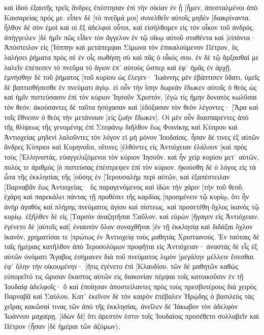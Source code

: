καὶ ἰδοὺ ἐξαυτῆς τρεῖς ἄνδρες ἐπέστησαν ἐπὶ τὴν οἰκίαν ἐν ᾗ [ἦμεν, ἀπεσταλμένοι ἀπὸ Καισαρείας πρός με. 
εἶπεν δὲ [τὸ πνεῦμά μοι] συνελθεῖν αὐτοῖς μηδὲν [διακρίναντα. ἦλθον δὲ σὺν ἐμοὶ καὶ οἱ ἓξ ἀδελφοὶ οὗτοι, καὶ εἰσήλθομεν εἰς τὸν οἶκον τοῦ ἀνδρός. 
ἀπήγγειλεν [δὲ ἡμῖν πῶς εἶδεν τὸν ἄγγελον ἐν τῷ οἴκῳ αὐτοῦ σταθέντα καὶ [εἰπόντα· Ἀπόστειλον εἰς [Ἰόππην καὶ μετάπεμψαι Σίμωνα τὸν ἐπικαλούμενον Πέτρον, 
ὃς λαλήσει ῥήματα πρὸς σὲ ἐν οἷς σωθήσῃ σὺ καὶ πᾶς ὁ οἶκός σου. 
ἐν δὲ τῷ ἄρξασθαί με λαλεῖν ἐπέπεσεν τὸ πνεῦμα τὸ ἅγιον ἐπ᾽ αὐτοὺς ὥσπερ καὶ ἐφ᾽ ἡμᾶς ἐν ἀρχῇ. 
ἐμνήσθην δὲ τοῦ ῥήματος [τοῦ κυρίου ὡς ἔλεγεν· Ἰωάννης μὲν ἐβάπτισεν ὕδατι, ὑμεῖς δὲ βαπτισθήσεσθε ἐν πνεύματι ἁγίῳ. 
εἰ οὖν τὴν ἴσην δωρεὰν ἔδωκεν αὐτοῖς ὁ θεὸς ὡς καὶ ἡμῖν πιστεύσασιν ἐπὶ τὸν κύριον Ἰησοῦν Χριστόν, [ἐγὼ τίς ἤμην δυνατὸς κωλῦσαι τὸν θεόν; 
ἀκούσαντες δὲ ταῦτα ἡσύχασαν καὶ [ἐδόξασαν τὸν θεὸν λέγοντες· [Ἄρα καὶ τοῖς ἔθνεσιν ὁ θεὸς τὴν μετάνοιαν [εἰς ζωὴν ἔδωκεν]. 
Οἱ μὲν οὖν διασπαρέντες ἀπὸ τῆς θλίψεως τῆς γενομένης ἐπὶ Στεφάνῳ διῆλθον ἕως Φοινίκης καὶ Κύπρου καὶ Ἀντιοχείας μηδενὶ λαλοῦντες τὸν λόγον εἰ μὴ μόνον Ἰουδαίοις. 
ἦσαν δέ τινες ἐξ αὐτῶν ἄνδρες Κύπριοι καὶ Κυρηναῖοι, οἵτινες [ἐλθόντες εἰς Ἀντιόχειαν ἐλάλουν [καὶ πρὸς τοὺς [Ἑλληνιστάς, εὐαγγελιζόμενοι τὸν κύριον Ἰησοῦν. 
καὶ ἦν χεὶρ κυρίου μετ᾽ αὐτῶν, πολύς τε ἀριθμὸς [ὁ πιστεύσας ἐπέστρεψεν ἐπὶ τὸν κύριον. 
ἠκούσθη δὲ ὁ λόγος εἰς τὰ ὦτα τῆς ἐκκλησίας τῆς [οὔσης ἐν [Ἰερουσαλὴμ περὶ αὐτῶν, καὶ ἐξαπέστειλαν [Βαρναβᾶν ἕως Ἀντιοχείας· 
ὃς παραγενόμενος καὶ ἰδὼν τὴν χάριν [τὴν τοῦ θεοῦ, ἐχάρη καὶ παρεκάλει πάντας τῇ προθέσει τῆς καρδίας [προσμένειν τῷ κυρίῳ, 
ὅτι ἦν ἀνὴρ ἀγαθὸς καὶ πλήρης πνεύματος ἁγίου καὶ πίστεως. καὶ προσετέθη ὄχλος ἱκανὸς τῷ κυρίῳ. 
ἐξῆλθεν δὲ εἰς [Ταρσὸν ἀναζητῆσαι Σαῦλον, 
καὶ εὑρὼν [ἤγαγεν εἰς Ἀντιόχειαν. ἐγένετο δὲ [αὐτοῖς καὶ] ἐνιαυτὸν ὅλον συναχθῆναι [ἐν τῇ ἐκκλησίᾳ καὶ διδάξαι ὄχλον ἱκανόν, χρηματίσαι τε [πρώτως ἐν Ἀντιοχείᾳ τοὺς μαθητὰς Χριστιανούς. 
Ἐν ταύταις δὲ ταῖς ἡμέραις κατῆλθον ἀπὸ Ἱεροσολύμων προφῆται εἰς Ἀντιόχειαν· 
ἀναστὰς δὲ εἷς ἐξ αὐτῶν ὀνόματι Ἅγαβος ἐσήμανεν διὰ τοῦ πνεύματος λιμὸν [μεγάλην μέλλειν ἔσεσθαι ἐφ᾽ ὅλην τὴν οἰκουμένην· [ἥτις ἐγένετο ἐπὶ [Κλαυδίου. 
τῶν δὲ μαθητῶν καθὼς εὐπορεῖτό τις ὥρισαν ἕκαστος αὐτῶν εἰς διακονίαν πέμψαι τοῖς κατοικοῦσιν ἐν τῇ Ἰουδαίᾳ ἀδελφοῖς· 
ὃ καὶ ἐποίησαν ἀποστείλαντες πρὸς τοὺς πρεσβυτέρους διὰ χειρὸς Βαρναβᾶ καὶ Σαύλου. 
Κατ᾽ ἐκεῖνον δὲ τὸν καιρὸν ἐπέβαλεν Ἡρῴδης ὁ βασιλεὺς τὰς χεῖρας κακῶσαί τινας τῶν ἀπὸ τῆς ἐκκλησίας. 
ἀνεῖλεν δὲ Ἰάκωβον τὸν ἀδελφὸν Ἰωάννου μαχαίρῃ. 
[ἰδὼν δὲ] ὅτι ἀρεστόν ἐστιν τοῖς Ἰουδαίοις προσέθετο συλλαβεῖν καὶ Πέτρον (ἦσαν [δὲ ἡμέραι τῶν ἀζύμων), 
